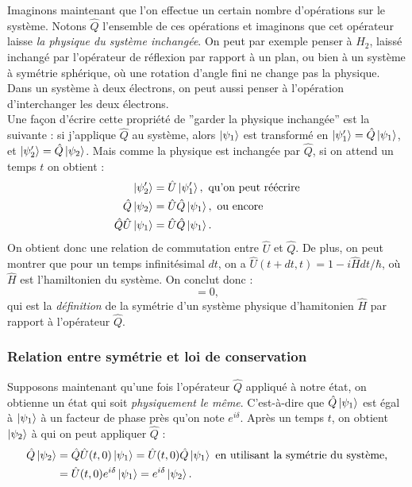 Imaginons maintenant que l'on effectue un certain nombre d'opérations sur le système. Notons $\hat{Q}$ l'ensemble de ces opérations et imaginons que cet opérateur laisse \textit{la physique du système inchangée}. On peut par exemple penser à $H_2$, laissé inchangé par l'opérateur de réflexion par rapport à un plan, ou bien à un système à symétrie sphérique, où une rotation d'angle fini ne change pas la physique. Dans un système à deux électrons, on peut aussi penser à l'opération d'interchanger les deux électrons. \\
Une façon d'écrire cette propriété de ''garder la physique inchangée'' est la suivante : si j'applique $\hat{Q}$ au système, alors $\ket{\psi_1}$ est transformé en $\ket{\psi'_1}=\hat{Q}\ket{\psi_1}$, et $\ket{\psi'_2}=\hat{Q}\ket{\psi_2}$. Mais comme la physique est inchangée par $\hat{Q}$, si on attend un temps $t$ on obtient :
\begin{align*}
\ket{\psi'_2}&=\hat{U}\ket{\psi'_1}, \mbox{ qu'on peut réécrire}\\
\hat{Q}\ket{\psi_2}&=\hat{U}\hat{Q}\ket{\psi_1}, \mbox{ ou encore}\\
\hat{Q}\hat{U}\ket{\psi_1}&=\hat{U}\hat{Q}\ket{\psi_1}.
\end{align*}
On obtient donc une relation de commutation entre $\hat{U}$ et $\hat{Q}$. De plus, on peut montrer que pour un temps infinitésimal $dt$, on a $\hat{U}(t+dt,t) = 1-i\hat{H}dt/\hbar$, où $\hat{H}$ est l'hamiltonien du système. On conclut donc :
\begin{equation*}
[\hat{H},\hat{Q}]=0,
\end{equation*}
qui est la \textit{définition} de la symétrie d'un système physique d'hamitonien $\hat{H}$ par rapport à l'opérateur $\hat{Q}$.

\subsubsection{Relation entre symétrie et loi de conservation}
Supposons maintenant qu'une fois l'opérateur $\hat{Q}$ appliqué à notre état, on obtienne un état qui soit \textit{physiquement le même}. C'est-à-dire que $\hat{Q}\ket{\psi_1}$ est égal à $\ket{\psi_1}$ à un facteur de phase près qu'on note $e^{i\delta}$. Après un temps $t$, on obtient $\ket{\psi_2}$ à qui on peut appliquer $\hat{Q}$ :
\begin{align*}
\hat{Q}\ket{\psi_2}&=\hat{Q}\hat{U}(t,0)\ket{\psi_1}=\hat{U}(t,0)\hat{Q}\ket{\psi_1} \mbox{ en utilisant la symétrie du système,}\\
		&=\hat{U}(t,0)e^{i\delta}\ket{\psi_1}=e^{i\delta}\ket{\psi_2}.
\end{align*}

